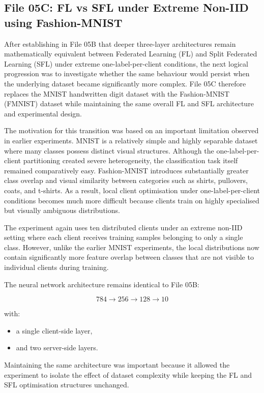 \subsection*{File 05C: FL vs SFL under Extreme Non-IID using Fashion-MNIST}

After establishing in File 05B that deeper three-layer architectures remain mathematically equivalent between Federated Learning (FL) and Split Federated Learning (SFL) under extreme one-label-per-client conditions, the next logical progression was to investigate whether the same behaviour would persist when the underlying dataset became significantly more complex. File 05C therefore replaces the MNIST handwritten digit dataset with the Fashion-MNIST (FMNIST) dataset while maintaining the same overall FL and SFL architecture and experimental design.

The motivation for this transition was based on an important limitation observed in earlier experiments. MNIST is a relatively simple and highly separable dataset where many classes possess distinct visual structures. Although the one-label-per-client partitioning created severe heterogeneity, the classification task itself remained comparatively easy. Fashion-MNIST introduces substantially greater class overlap and visual similarity between categories such as shirts, pullovers, coats, and t-shirts. As a result, local client optimisation under one-label-per-client conditions becomes much more difficult because clients train on highly specialised but visually ambiguous distributions.

The experiment again uses ten distributed clients under an extreme non-IID setting where each client receives training samples belonging to only a single class. However, unlike the earlier MNIST experiments, the local distributions now contain significantly more feature overlap between classes that are not visible to individual clients during training.

The neural network architecture remains identical to File 05B:

\[
784 \rightarrow 256 \rightarrow 128 \rightarrow 10
\]

with:
\begin{itemize}
    \item a single client-side layer,
    \item and two server-side layers.
\end{itemize}

Maintaining the same architecture was important because it allowed the experiment to isolate the effect of dataset complexity while keeping the FL and SFL optimisation structures unchanged.

